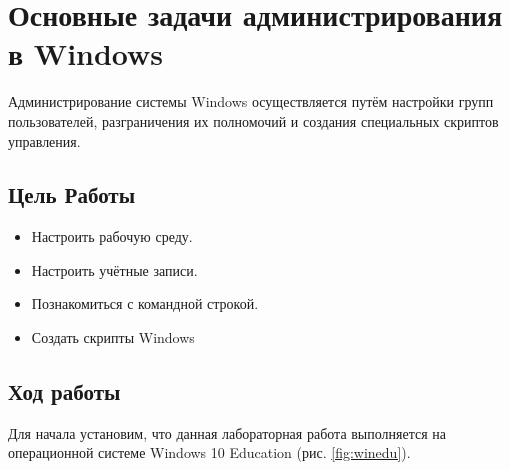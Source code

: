 \tableofcontents
\newpage
\section{Основные задачи администрирования в Windows}
\label{GL1}
Администрирование системы Windows осуществляется путём настройки групп пользователей, разграничения их полномочий и создания специальных скриптов управления.
\subsection{Цель Работы}
\begin{itemize}
    \item Настроить рабочую среду.
    \item Настроить учётные записи.
    \item Познакомиться с командной строкой.
    \item Создать скрипты Windows
\end{itemize}
\subsection{Ход работы}

Для начала установим, что данная лабораторная работа выполняется на операционной системе Windows 10 Education (рис. \ref{fig:winedu}). 

